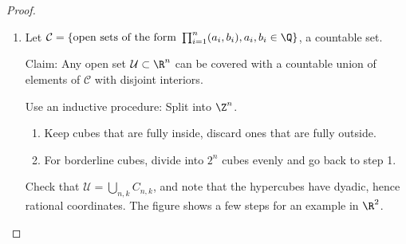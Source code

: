 \documentclass[twoside]{article}
\begin{document}
\begin{proof}
    \leavevmode
    \begin{enumerate}[label=(\arabic*)]
        \item Let $\mathcal{C} = \{\text{open sets of the form } \prod_{i=1}^n (a_i, b_i), a_i, b_i \in \Q\}$, a countable set.

            Claim: Any open set $\mathcal{U} \subset \R^n$ can be covered with a countable union of elements of $\mathcal{C}$ with disjoint interiors.

            Use an inductive procedure: Split into $\Z^n$.
            \begin{enumerate}[label=\arabic*.]
                \item Keep cubes that are fully inside, discard ones that are fully outside.
                \item For borderline cubes, divide into $2^n$ cubes evenly and go back to step 1.
            \end{enumerate}
            Check that $\mathcal{U} = \bigcup_{n, k} C_{n, k}$, and note that the hypercubes have dyadic, hence rational coordinates.
            The figure shows a few steps for an example in $\R^2$.
            \begin{center}
\end{center}
\end{enumerate}
\end{proof}
\end{document}
